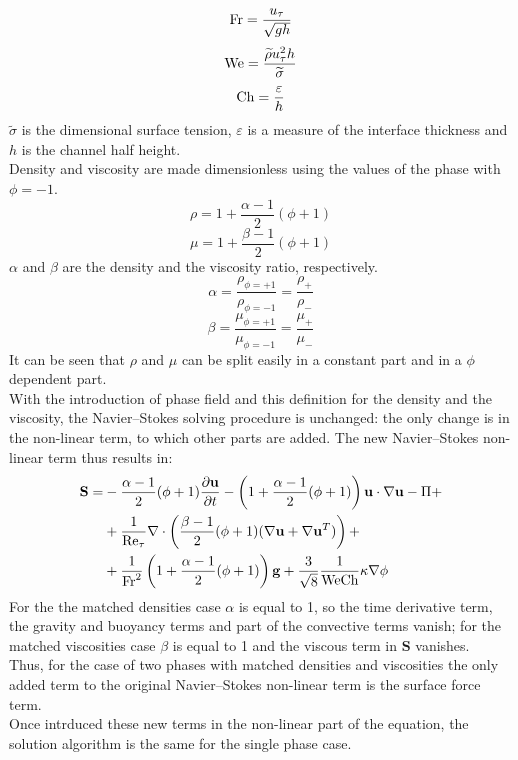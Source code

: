 \[
\textnormal{Fr}=\frac{u_\tau}{\sqrt{gh}}
\]
\[
\textnormal{We}=\dfrac{\widetilde{\rho} u_\tau^2 h}{\widetilde{\sigma}} 
\]
\[
\textnormal{Ch}=\dfrac{\varepsilon}{h} 
\]
$\widetilde{\sigma}$ is the dimensional surface tension, $\varepsilon$ is a measure of the interface thickness and $h$ is the channel half height.\\
Density and viscosity are made dimensionless using the values of the phase with $\phi=-1$.
\[
\rho=1+\frac{\alpha-1}{2}(\phi+1)
\]
\[
\mu=1+\frac{\beta-1}{2}(\phi+1)
\]
$\alpha$ and $\beta$ are the density and the viscosity ratio, respectively.
\[
\alpha=\frac{\rho_{\phi=+1}}{\rho_{\phi=-1}}=\frac{\rho_+}{\rho_-}
\]
\[
\beta=\frac{\mu_{\phi=+1}}{\mu_{\phi=-1}}=\frac{\mu_+}{\mu_-}
\]
It can be seen that $\rho$ and $\mu$ can be split easily in a constant part and in a $\phi$ dependent part.\\
With the introduction of phase field and this definition for the density and the viscosity, the Navier--Stokes solving procedure is unchanged: the only change is in the non-linear term, to which other parts are added. The new Navier--Stokes non-linear term thus results in:
\[
\begin{split}
\mathbf{S}=&-\frac{\alpha-1}{2}(\phi+1)\frac{\partial\mathbf{u}}{\partial t}-\left(1+\frac{\alpha-1}{2}(\phi+1)\right)\mathbf{u}\cdot\nabla\mathbf{u}-\Pi+ \\
& +\frac{1}{\textnormal{Re}_\tau}\nabla\cdot\left(\frac{\beta-1}{2}(\phi+1)(\nabla\mathbf{u}+\nabla\mathbf{u}^T)\right)+\\
&+\frac{1}{\textnormal{Fr}^2}\left(1+\frac{\alpha-1}{2}(\phi+1)\right)\mathbf{g}+\dfrac{3}{\sqrt{8}}\dfrac{1}{\textnormal{We}\textnormal{Ch}}\kappa\nabla\phi
\end{split}
\]
For the the matched densities case $\alpha$ is equal to 1, so the time derivative term, the gravity and buoyancy terms and part of the convective terms vanish; for the matched viscosities case $\beta$ is equal to 1 and the viscous term in $\mathbf{S}$ vanishes.\\
Thus, for the case of two phases with matched densities and viscosities the only added term to the original Navier--Stokes non-linear term is the surface force term.\\
Once intrduced these new terms in the non-linear part of the equation, the solution algorithm is the same for the single phase case.

